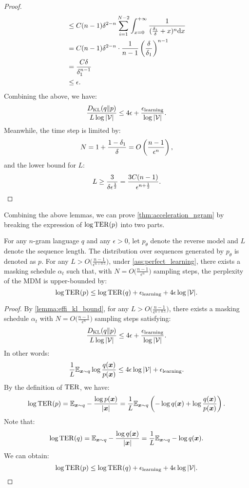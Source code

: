 \begin{proof}
\begin{align*}
        &\leq C(n-1)\delta^{2-n}\sum_{i=1}^{N-2}\int_{x=0}^{+\infty}\frac{1}{(\frac{\delta_1}{\delta}+x)^n\mathrm{d} x}\\
        &=C(n-1)\delta^{2-n}\cdot\frac{1}{n-1}\left(\frac{\delta}{\delta_1}\right)^{n-1}\\
        &=\frac{C\delta}{\delta_1^{n-1}}\\
        &\leq{\epsilon}.
    \end{align*}
    Combining the above, we have:
    $$\frac{D_{\mathrm{KL}}(q\|p)}{L\log|{\mathcal{V}}|}\leq 4{\epsilon}+\frac{{\epsilon}_\mathrm{learning}}{\log|{\mathcal{V}}|}.$$
    Meanwhile, the time step is limited by:
    $$N=1+\frac{1-\delta_1}{\delta}=O\left(\frac{n-1}{{\epsilon}^n}\right),$$
    and the lower bound for $L$:
    $$L\geq \frac{3}{\delta{\epsilon}^{\frac{1}{2}}}=\frac{3C(n-1)}{{\epsilon}^{n+\frac{1}{2}}}.$$

\end{proof}

Combining the above lemmas, we can prove \cref{thm:acceleration_ngram} by breaking the expression of $\log\operatorname{TER}(p)$ into two parts.

\begin{theorem}
    For any $n$-gram language $q$ and any $\epsilon > 0$, let $p_\mathsf{\theta}$ denote the reverse model and $L$ denote the sequence length. The distribution over sequences generated by $p_\mathsf{\theta}$ is denoted as $p$. For any $L>O\big( \frac{n-1}{\epsilon^{n+0.5}}\big)$, under \cref{ass:perfect_learning}, there exists a masking schedule $\alpha_t$ such that, with $N = O\big( \frac{n-1}{\epsilon^n}\big)$ sampling steps, the perplexity of the MDM is upper-bounded by:
    $$\log\operatorname{TER}(p) \leq \log\operatorname{TER}(q) + \epsilon_\text{learning} + 4\epsilon\log |{\mathcal{V}}|.$$
\end{theorem}

\begin{proof}
    By \cref{lemma:effi_kl_bound}, for any $L>O\big( \frac{n-1}{\epsilon^{n+0.5}}\big)$, there exists a masking schedule $\alpha_t$ with $N = O\big( \frac{n-1}{\epsilon^n}\big)$ sampling steps satisfying:
    $$\frac{D_{\mathrm{KL}}(q\|p)}{L\log|{\mathcal{V}}|} \leq 4{\epsilon}+\frac{{\epsilon}_\mathrm{learning}}{\log|{\mathcal{V}}|}.$$
    In other words:
    $$\frac{1}{L}\mathbb{E}_{{\bm{x}} \sim q}
    \log \frac{q({\bm{x}})}{p({\bm{x}})}\leq 4{\epsilon}\log|{\mathcal{V}}|+{\epsilon}_\mathrm{learning}.$$
    By the definition of $\operatorname{TER}$, we have:
    $$\log\operatorname{TER}(p) = \mathbb{E}_{{\bm{x}} \sim q} -\frac{\log p({\bm{x}})}{|{\bm{x}}|}=\frac{1}{L}\mathbb{E}_{{\bm{x}} \sim q}\left(-\log q({\bm{x}})+\log\frac{q({\bm{x}})}{p({\bm{x}})}\right).$$
    Note that:
    $$\log\operatorname{TER}(q) = \mathbb{E}_{{\bm{x}} \sim q} -\frac{\log q({\bm{x}})}{|{\bm{x}}|}=\frac{1}{L}\mathbb{E}_{{\bm{x}} \sim q}-\log q({\bm{x}}).$$
    We can obtain:
    $$\log\operatorname{TER}(p) \leq \log\operatorname{TER}(q) + \epsilon_\text{learning} + 4\epsilon\log |{\mathcal{V}}|.$$
\end{proof}
